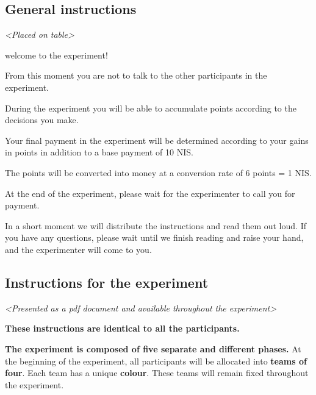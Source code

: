 



%
\setlength\parindent{0pt}


\subsection*{General instructions}
\emph{<Placed on table>}
\bigskip

welcome to the experiment!

From this moment you are not to talk to the other participants in the experiment.

During the experiment you will be able to accumulate points according to the decisions you make.

Your final payment in the experiment will be determined according to your gains in points in addition to a base payment of 10 NIS.

The points will be converted into money at a conversion rate of 6 points = 1 NIS.

At the end of the experiment, please wait for the experimenter to call you for payment.
\bigskip

In a short moment we will distribute the instructions and read them out loud. If you have any questions, please wait until we finish reading and raise your hand, and the experimenter will come to you.


\newpage

\subsection*{Instructions for the experiment}
\emph{<Presented as a pdf document and available throughout the experiment>}
\bigskip

\textbf{These instructions are identical to all the participants.}

\textbf{The experiment is composed of five separate and different phases.} At the beginning of the experiment, all participants will be allocated into \textbf{teams of four}. Each team has a unique \textbf{colour}. These teams will remain fixed throughout the experiment.

